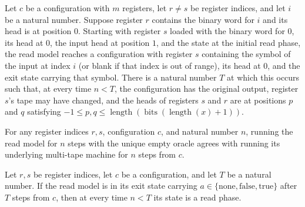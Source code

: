 \begin{theorem}
\label{Complexity.LogProg.read_model_run}
\leanok
{}
Let $c$ be a configuration with $m$ registers, let $r\ne s$ be register indices, and let
$i$ be a natural number. Suppose register $r$ contains the binary word for $i$ and its
head is at position $0$. Starting with register $s$ loaded with the binary word for $0$,
its head at $0$, the input head at position $1$, and the state at the initial read
phase, the read model reaches a configuration with register $s$ containing the symbol of
the input at index $i$ (or blank if that index is out of range), its head at $0$, and
the exit state carrying that symbol. There is a natural number $T$ at which this occurs
such that, at every time $n<T$, the configuration has the original output, register
$s$'s tape may have changed, and the heads of registers $s$ and $r$ are at positions $p$
and $q$ satisfying $-1\le p,q\le
\operatorname{length}(\operatorname{bits}(\operatorname{length}(x)+1))$.
\end{theorem}

\begin{theorem}
\label{Complexity.LogProg.read_run_eq}
\leanok
{}
For any register indices $r,s$, configuration $c$, and natural number $n$, running the
read model for $n$ steps with the unique empty oracle agrees with running its underlying
multi-tape machine for $n$ steps from $c$.
\end{theorem}

\begin{theorem}
\label{Complexity.LogProg.read_model_phase}
\leanok
{}
Let $r,s$ be register indices, let $c$ be a configuration, and let $T$ be a natural
number. If the read model is in its exit state carrying
$a\in\{\mathrm{none},\mathrm{false},\mathrm{true}\}$ after $T$ steps from $c$, then at
every time $n<T$ its state is a read phase.
\end{theorem}

